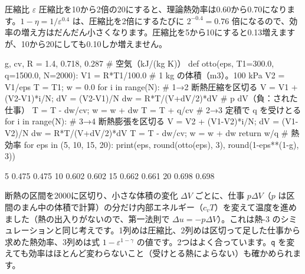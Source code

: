 \begin{phbaisuru}{圧縮比 $\varepsilon$}
圧縮比を10から2倍の20にすると、理論熱効率は0.60から0.70になります。$1-\eta=1/\varepsilon^{0.4}$ は、圧縮比を2倍にするたびに $2^{-0.4}=0.76$ 倍になるので、効率の増え方はだんだん小さくなります。圧縮比を5から10にすると0.13増えますが、10から20にしても0.10しか増えません。
\par\smallskip\noindent\begin{center}
\end{center}
\end{phbaisuru}

\begin{phcode}
g, cv, R = 1.4, 0.718, 0.287   \# 空気（kJ/(kg K)）
def otto(eps, T1=300.0, q=1500.0, N=2000):
    V1 = R*T1/100.0             \# 1 kg の体積（m3）。100 kPa
    V2 = V1/eps
    T = T1; w = 0.0
    for i in range(N):          \# 1→2 断熱圧縮を区切る
        V = V1 + (V2-V1)*i/N; dV = (V2-V1)/N
        dw = R*T/(V+dV/2)*dV    \# p dV（負：された仕事）
        T = T - dw/cv; w = w + dw
    T = T + q/cv                \# 2→3 定積で q を受けとる
    for i in range(N):          \# 3→4 断熱膨張を区切る
        V = V2 + (V1-V2)*i/N; dV = (V1-V2)/N
        dw = R*T/(V+dV/2)*dV
        T = T - dw/cv; w = w + dw
    return w/q                  \# 熱効率
for eps in (5, 10, 15, 20):
    print(eps, round(otto(eps), 3), round(1-eps**(1-g), 3))
\end{phcode}
\begin{phcodeout}
5 0.475 0.475
10 0.602 0.602
15 0.662 0.661
20 0.698 0.698
\end{phcodeout}
断熱の区間を2000に区切り、小さな体積の変化 $\Delta V$ ごとに、仕事 $p\Delta V$（$p$ は区間のまん中の体積で計算）の分だけ内部エネルギー（$c_v T$）を変えて温度を進めました（熱の出入りがないので、第一法則で $\Delta u=-p\Delta V$）。これは熱-3 のシミュレーションと同じ考えです。1列めは圧縮比、2列めは区切って足した仕事から求めた熱効率、3列めは式 $1-\varepsilon^{1-\gamma}$ の値です。2つはよく合っています。\texttt{q} を変えても効率はほとんど変わらないこと（受けとる熱によらない）も確かめられます。

